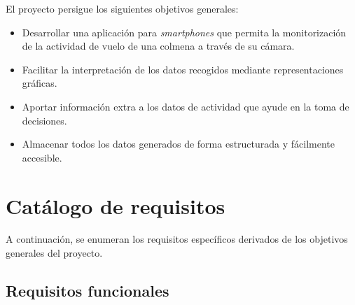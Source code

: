 El proyecto persigue los siguientes objetivos generales:

\begin{itemize}
\tightlist
\item
  Desarrollar una aplicación para \emph{smartphones} que permita la
  monitorización de la actividad de vuelo de una colmena a través de su
  cámara.
\item
  Facilitar la interpretación de los datos recogidos mediante
  representaciones gráficas.
\item
  Aportar información extra a los datos de actividad que ayude en la
  toma de decisiones.
\item
  Almacenar todos los datos generados de forma estructurada y fácilmente
  accesible.
\end{itemize}

\section{Catálogo de requisitos}\label{catalogo-de-requisitos}

A continuación, se enumeran los requisitos específicos derivados de los
objetivos generales del proyecto.

\subsection{Requisitos funcionales}\label{requisitos-funcionales}

